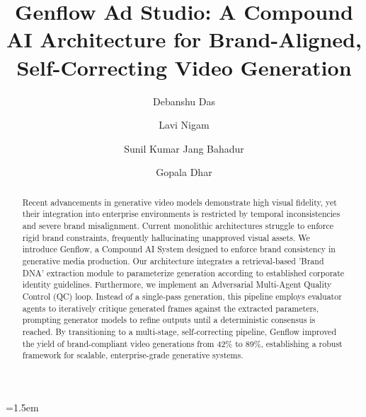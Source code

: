 \documentclass[sigconf]{acmart}
\begin{document}
\emergencystretch=1.5em

\title{Genflow Ad Studio: A Compound AI Architecture for Brand-Aligned, Self-Correcting Video Generation}

\author{Debanshu Das}
\affiliation{%
  \institution{}
  \country{}
}

\author{Lavi Nigam}
\affiliation{%
  \institution{}
  \country{}
}

\author{Sunil Kumar Jang Bahadur}
\affiliation{%
  \institution{}
  \country{}
}

\author{Gopala Dhar}
\affiliation{%
  \institution{}
  \country{}
}

\renewcommand{\shortauthors}{Das, Nigam, Jang Bahadur, and Dhar}

\begin{abstract}
Recent advancements in generative video models demonstrate high visual fidelity, yet their integration into enterprise environments is restricted by temporal inconsistencies and severe brand misalignment. Current monolithic architectures struggle to enforce rigid brand constraints, frequently hallucinating unapproved visual assets. We introduce Genflow, a Compound AI System designed to enforce brand consistency in generative media production. Our architecture integrates a retrieval-based 'Brand DNA' extraction module to parameterize generation according to established corporate identity guidelines. Furthermore, we implement an Adversarial Multi-Agent Quality Control (QC) loop. Instead of a single-pass generation, this pipeline employs evaluator agents to iteratively critique generated frames against the extracted parameters, prompting generator models to refine outputs until a deterministic consensus is reached. By transitioning to a multi-stage, self-correcting pipeline, Genflow improved the yield of brand-compliant video generations from 42\% to 89\%, establishing a robust framework for scalable, enterprise-grade generative systems.
\end{abstract}
\end{document}
